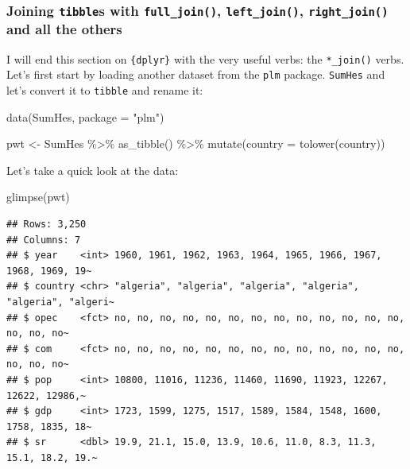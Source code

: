 \documentclass[
]{article}
\newenvironment{Shaded}{\begin{snugshade}}{\end{snugshade}}
\newcommand{\AttributeTok}[1]{\textcolor[rgb]{0.77,0.63,0.00}{#1}}
\newcommand{\FunctionTok}[1]{\textcolor[rgb]{0.00,0.00,0.00}{#1}}
\newcommand{\NormalTok}[1]{#1}
\newcommand{\OtherTok}[1]{\textcolor[rgb]{0.56,0.35,0.01}{#1}}
\newcommand{\SpecialCharTok}[1]{\textcolor[rgb]{0.00,0.00,0.00}{#1}}
\newcommand{\StringTok}[1]{\textcolor[rgb]{0.31,0.60,0.02}{#1}}
\begin{document}
\hypertarget{joining-tibbles-with-full_join-left_join-right_join-and-all-the-others}{%
\subsubsection{\texorpdfstring{Joining \texttt{tibble}s with \texttt{full\_join()}, \texttt{left\_join()}, \texttt{right\_join()} and all the others}{Joining tibbles with full\_join(), left\_join(), right\_join() and all the others}}\label{joining-tibbles-with-full_join-left_join-right_join-and-all-the-others}}

I will end this section on \texttt{\{dplyr\}} with the very useful verbs: the \texttt{*\_join()} verbs. Let's first
start by loading another dataset from the \texttt{plm} package. \texttt{SumHes} and let's convert it to \texttt{tibble}
and rename it:

\begin{Shaded}
\begin{Highlighting}[]
\FunctionTok{data}\NormalTok{(SumHes, }\AttributeTok{package =} \StringTok{"plm"}\NormalTok{)}

\NormalTok{pwt }\OtherTok{\textless{}{-}}\NormalTok{ SumHes }\SpecialCharTok{\%\textgreater{}\%}
  \FunctionTok{as\_tibble}\NormalTok{() }\SpecialCharTok{\%\textgreater{}\%}
  \FunctionTok{mutate}\NormalTok{(}\AttributeTok{country =} \FunctionTok{tolower}\NormalTok{(country))}
\end{Highlighting}
\end{Shaded}

Let's take a quick look at the data:

\begin{Shaded}
\begin{Highlighting}[]
\FunctionTok{glimpse}\NormalTok{(pwt)}
\end{Highlighting}
\end{Shaded}

\begin{verbatim}
## Rows: 3,250
## Columns: 7
## $ year    <int> 1960, 1961, 1962, 1963, 1964, 1965, 1966, 1967, 1968, 1969, 19~
## $ country <chr> "algeria", "algeria", "algeria", "algeria", "algeria", "algeri~
## $ opec    <fct> no, no, no, no, no, no, no, no, no, no, no, no, no, no, no, no~
## $ com     <fct> no, no, no, no, no, no, no, no, no, no, no, no, no, no, no, no~
## $ pop     <int> 10800, 11016, 11236, 11460, 11690, 11923, 12267, 12622, 12986,~
## $ gdp     <int> 1723, 1599, 1275, 1517, 1589, 1584, 1548, 1600, 1758, 1835, 18~
## $ sr      <dbl> 19.9, 21.1, 15.0, 13.9, 10.6, 11.0, 8.3, 11.3, 15.1, 18.2, 19.~
\end{verbatim}
\end{document}
